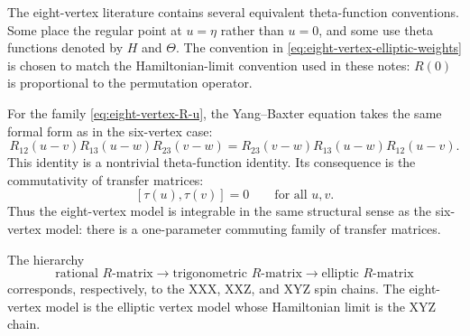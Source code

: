 \begin{remark}
The eight-vertex literature contains several equivalent theta-function
conventions.  Some place the regular point at $u=\eta$ rather than $u=0$, and
some use theta functions denoted by $H$ and $\Theta$.  The convention in
\cref{eq:eight-vertex-elliptic-weights} is chosen to match the Hamiltonian-limit
convention used in these notes: $R(0)$ is proportional to the permutation
operator.
\end{remark}

For the family \cref{eq:eight-vertex-R-u}, the Yang--Baxter equation takes the
same formal form as in the six-vertex case:
\begin{equation}
\label{eq:eight-vertex-YBE}
    R_{12}(u-v)R_{13}(u-w)R_{23}(v-w)
    =
    R_{23}(v-w)R_{13}(u-w)R_{12}(u-v).
\end{equation}
This identity is a nontrivial theta-function identity.  Its consequence is the
commutativity of transfer matrices:
\begin{equation}
\label{eq:eight-vertex-commuting-transfer-matrices}
    [\tau(u),\tau(v)]=0
    \qquad
    \text{for all }u,v .
\end{equation}
Thus the eight-vertex model is integrable in the same structural sense as the
six-vertex model: there is a one-parameter commuting family of transfer
matrices.

\begin{principle}
The hierarchy
\begin{equation}
    \text{rational }R\text{-matrix}
    \longrightarrow
    \text{trigonometric }R\text{-matrix}
    \longrightarrow
    \text{elliptic }R\text{-matrix}
\end{equation}
corresponds, respectively, to the XXX, XXZ, and XYZ spin chains.  The eight-vertex
model is the elliptic vertex model whose Hamiltonian limit is the XYZ chain.
\end{principle}

